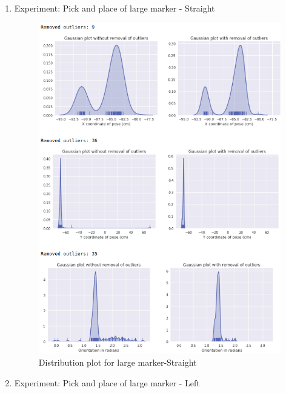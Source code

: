 \documentclass[11pt,a4paper]{article}
\begin{document}
\begin{enumerate}
				\newpage
				\item Experiment: Pick and place of large marker - Straight
				\begin{figure}[H]
					\centering
					\includegraphics[scale=0.6]{large-str}	
					\caption{Distribution plot for large marker-Straight}
				\end{figure}
				\newpage
				\item Experiment: Pick and place of large marker - Left
				\begin{figure}[H]
					\centering

\end{figure}
\end{enumerate}
\end{document}
